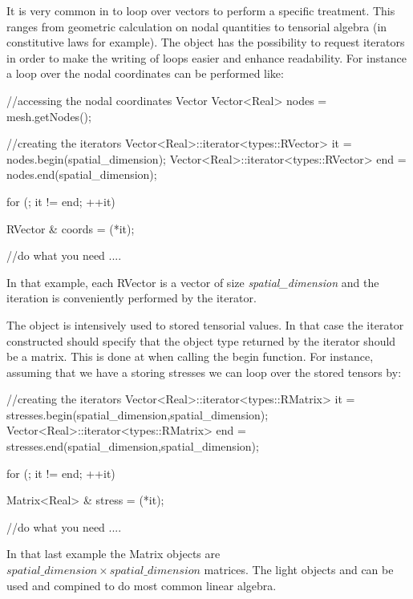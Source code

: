 It is very common in \akantu to loop over vectors to perform a specific 
treatment. This ranges from geometric calculation on nodal quantities 
to tensorial algebra (in constitutive laws for example).
The  object has the possibility to request iterators 
in order to make the writing of loops easier and enhance readability.
For instance a loop over the nodal coordinates can be performed like:
\begin{cpp}
  //accessing the nodal coordinates Vector
  Vector<Real> nodes = mesh.getNodes();
  
  //creating the iterators
  Vector<Real>::iterator<types::RVector> it  = nodes.begin(spatial_dimension);
  Vector<Real>::iterator<types::RVector> end = nodes.end(spatial_dimension);
  
  for (; it != end; ++it){
    RVector & coords = (*it);
    
    //do what you need
    ....
    
  }
\end{cpp}
In that example, each RVector is a vector of size \textit{spatial\_dimension}
and the iteration is conveniently performed by the  iterator.

The  object is intensively used to stored tensorial values.
In that case the iterator constructed should specify that the object type
returned by the iterator should be a matrix. This is done at when calling the 
begin function. For instance, assuming that we have a  storing 
stresses we can loop over the stored tensors by:

\begin{cpp}
  //creating the iterators
  Vector<Real>::iterator<types::RMatrix> it  = stresses.begin(spatial_dimension,spatial_dimension);
  Vector<Real>::iterator<types::RMatrix> end = stresses.end(spatial_dimension,spatial_dimension);
  
  for (; it != end; ++it){
    Matrix<Real> & stress = (*it);
    
    //do what you need
    ....
    
  }
\end{cpp}
In that last example the Matrix objects are 
$spatial\_dimension \times spatial\_dimension$ matrices.
The light objects  and  can be used and compined 
to do most common linear algebra.

